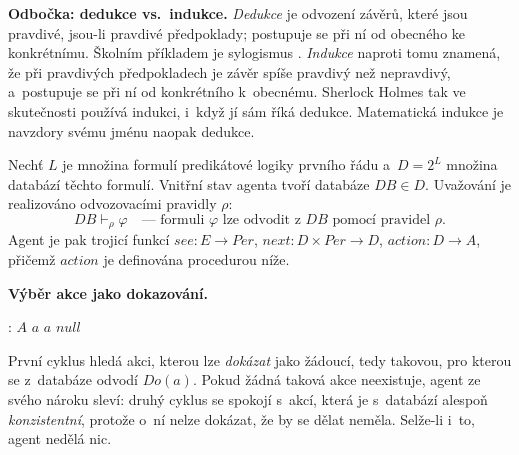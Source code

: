 \documentclass[11pt,a4paper]{article}
\theoremstyle{definition}
\begin{document}
\medskip
\noindent\textbf{Odbočka: dedukce vs.\ indukce.}
\emph{Dedukce} je odvození závěrů, které jsou pravdivé, jsou-li pravdivé předpoklady; postupuje
se při ní od obecného ke konkrétnímu. Školním příkladem je sylogismus . \emph{Indukce} naproti tomu znamená,
že při pravdivých předpokladech je závěr spíše pravdivý než nepravdivý, a~postupuje se při ní
od konkrétního k~obecnému. Sherlock Holmes tak ve skutečnosti používá indukci, i~když jí sám
říká dedukce. Matematická indukce je navzdory svému jménu naopak dedukce.

\begin{defbox}
Nechť $L$ je množina formulí predikátové logiky prvního řádu a~$D = 2^L$ množina databází těchto
formulí. Vnitřní stav agenta tvoří databáze $\mathit{DB} \in D$. Uvažování je realizováno
odvozovacími pravidly $\rho$:
\[
\mathit{DB} \vdash_\rho \varphi \quad\text{---\ formuli } \varphi \text{ lze odvodit z } \mathit{DB}
\text{ pomocí pravidel } \rho .
\]
Agent je pak trojicí funkcí
$\mathit{see} : E \to \mathit{Per}$, $\mathit{next} : D \times \mathit{Per} \to D$,
$\mathit{action} : D \to A$, přičemž $\mathit{action}$ je definována procedurou níže.
\end{defbox}

\noindent\textbf{Výběr akce jako dokazování.}
\begin{algorithmic}[1]
 : $A$
     \Return $a$ \EndIf
  \EndFor
     \Return $a$ \EndIf
  \EndFor
  \State \Return $\mathit{null}$
\EndFunction
\end{algorithmic}

První cyklus hledá akci, kterou lze \emph{dokázat} jako žádoucí, tedy takovou, pro kterou se
z~databáze odvodí $\mathit{Do}(a)$. Pokud žádná taková akce neexistuje, agent ze svého nároku
sleví: druhý cyklus se spokojí s~akcí, která je s~databází alespoň \emph{konzistentní}, protože
o~ní nelze dokázat, že by se dělat neměla. Selže-li i~to, agent nedělá nic.
\end{document}
